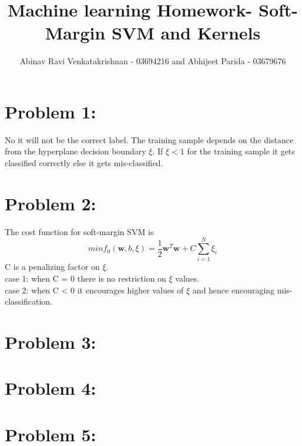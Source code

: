 \documentclass[5pt,a4paper]{article}
\begin{document}
	\title{Machine learning Homework- Soft-Margin SVM and Kernels }
	\author{Abinav Ravi Venkatakrishnan - 03694216 and Abhijeet Parida - 03679676}
	\maketitle
	\section*{Problem 1:}
	No it will not be the correct label. The training sample depends on the distance from the hyperplane decision boundary $\xi$. If $ \xi < 1 $ for the training sample it gets classified correctly else it gets mis-classified.
	
	\section*{Problem 2:}
	The cost function for soft-margin SVM is 
	\begin{equation}
	min f_0(\textbf{w},b,\xi) = \frac{1}{2}\textbf{w}^T \textbf{w}+ C \sum_{i=1}^{N} \xi_i
	\end{equation}
	C is a penalizing factor on $ \xi $. \\
	case 1: when C = 0 there is no restriction on $\xi$ values.\\
	case 2: when C < 0 it encourages higher values of $\xi$ and hence encouraging mis-classification.  
	\section*{Problem 3:}
	
	
	\section*{Problem 4:}
	
	\section*{Problem 5:}
	
	
\end{document}
